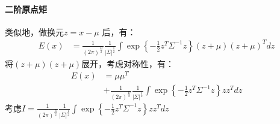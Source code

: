 \documentclass[cn,black,12pt,normal]{elegantnote}
\begin{document}
\paragraph{二阶原点矩}
类似地，做换元$z = x - \mu$ 后，有：
\begin{align*}
E(x) & = \frac{1}{(2\pi )^{\frac{D }{2} }} \frac{1}{\left | \Sigma  \right |^{\frac{1}{2} }  }\int 
\exp\left \{ -\frac{1}{2} z^T\Sigma^{-1}z \right \}(z+\mu)(z+\mu)^T dz  
\end{align*}
将$(z+\mu)(z+\mu)$展开，考虑对称性，有：
\begin{align*}
E(x) & = \mu\mu^T \\ & + \frac{1}{(2\pi )^{\frac{D }{2} }} \frac{1}{\left | \Sigma  \right |^{\frac{1}{2} }  }\int 
\exp\left \{ -\frac{1}{2} z^T\Sigma^{-1}z \right \} zz^T dz  
\end{align*}
考虑$I = \frac{1}{(2\pi )^{\frac{D }{2} }} \frac{1}{\left | \Sigma  \right |^{\frac{1}{2} }  }\int 
\exp\left \{ -\frac{1}{2} z^T\Sigma^{-1}z \right \} zz^T dz$
\end{document}
